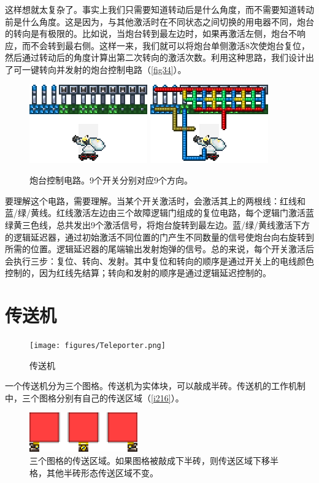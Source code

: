 这样想就太复杂了。事实上我们只需要知道转动后是什么角度，而不需要知道转动前是什么角度。这是因为，与其他激活时在不同状态之间切换的用电器不同，炮台的转向是有极限的。比如说，当炮台转到最左边时，如果再激活左侧，炮台不响应，而不会转到最右侧。这样一来，我们就可以将炮台单侧激活8次使炮台复位，然后通过转动后的角度计算出第二次转向的激活次数。利用这种思路，我们设计出了可一键转向并发射的炮台控制电路（\autoref{fig34}）。

\begin{figure}[!ht]
\centering
\includegraphics{images/398.png}
\qquad
\includegraphics{images/399.png}
\caption{炮台控制电路。9个开关分别对应9个方向。}\label{fig34}
\end{figure}

要理解这个电路，需要理解。当某个开关激活时，会激活其上的两根线：红线和蓝/绿/黄线。红线激活左边由三个故障逻辑门组成的复位电路，每个逻辑门激活蓝绿黄三色线，总共发出9个激活信号，将炮台旋转到最左边。蓝/绿/黄线激活下方的逻辑延迟器，通过初始激活不同位置的门产生不同数量的信号使炮台向右旋转到所需的位置。逻辑延迟器的尾端输出发射炮弹的信号。总的来说，每个开关激活后会执行三步：复位、转向、发射。其中复位和转向的顺序是通过开关上的电线颜色控制的，因为红线先结算；转向和发射的顺序是通过逻辑延迟控制的。

\section{传送机}\label{chuansongji}
\begin{figure}[!ht]
\centering
\texttt{[image: figures/Teleporter.png]}
\caption{传送机}
\end{figure}
一个传送机分为三个图格。传送机为实体块，可以敲成半砖。传送机的工作机制中，三个图格分别有自己的传送区域（\autoref{i216}）。

\begin{figure}[!ht]
\centering
\includegraphics{images/216.png}
\caption{三个图格的传送区域。如果图格被敲成下半砖，则传送区域下移半格，其他半砖形态传送区域不变。}
\label{i216}
\end{figure}

